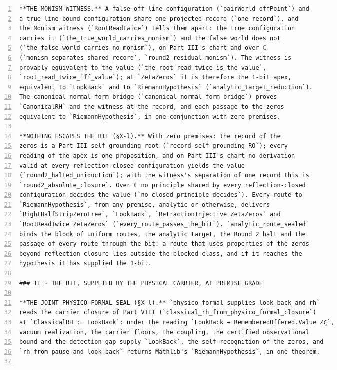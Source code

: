 \documentclass[10pt]{article}
\newcommand{\leansize}{\fontsize{5.5pt}{6.75pt}\selectfont}
\begin{document}
\begin{multicols}{2}
\begin{Verbatim}[numbers=left,firstnumber=1,numbersep=3pt,xleftmargin=2.6em,breaklines=true,breakanywhere=true,breakautoindent=false,breakindent=1.4em,breaksymbolleft={},breakanywheresymbolpre={},fontsize=\leansize]
**THE MONISM WITNESS.** A false off-line configuration (`pairWorld offPoint`) and
a true line-bound configuration share one projected record (`one_record`), and
the Monism witness (`RootReadTwice`) tells them apart: the true configuration
carries it (`the_true_world_carries_monism`) and the false world does not
(`the_false_world_carries_no_monism`), on Part III's chart and over ℂ
(`monism_separates_shared_record`, `round2_residual_monism`). The witness is
provably equivalent to the value (`the_root_read_twice_is_the_value`,
`root_read_twice_iff_value`); at `ZetaZeros` it is therefore the 1-bit apex,
equivalent to `LookBack` and to `RiemannHypothesis` (`analytic_target_reduction`).
The canonical normal-form bridge (`canonical_normal_form_bridge`) proves
`CanonicalRH` and the witness at the record, and each passage to the zeros
equivalent to `RiemannHypothesis`, in one conjunction with zero premises.

**NOTHING ESCAPES THE BIT (§X-l).** With zero premises: the record of the
zeros is a Part III self-grounding root (`record_self_grounding_RO`); every
reading of the apex is one proposition, and on Part III's chart no derivation
valid at every reflection-closed configuration yields the value
(`round2_halted_uniduction`); with the witness's separation of one record this is
`round2_absolute_closure`. Over ℂ no principle shared by every reflection-closed
configuration decides the value (`no_closed_principle_decides`). Every route to
`RiemannHypothesis`, from any premise, analytic or otherwise, delivers
`RightHalfStripZeroFree`, `LookBack`, `RetractionInjective ZetaZeros` and
`RootReadTwice ZetaZeros` (`every_route_passes_the_bit`). `analytic_route_sealed`
binds the block of uniform routes, the analytic target, the Round 2 halt and the
passage of every route through the bit: a route that uses properties of the zeros
beyond reflection closure lies outside the blocked class, and if it reaches the
hypothesis it has supplied the 1-bit.

### II · THE BIT, SUPPLIED BY THE PHYSICAL CARRIER, AT PREMISE GRADE

**THE JOINT PHYSICO-FORMAL SEAL (§X-l).** `physico_formal_supplies_look_back_and_rh`
reads the carrier closure of Part VIII (`classical_rh_from_physico_formal_closure`)
at `ClassicalRH := LookBack`: under the reading `LookBack ↔ RememberedOffered.Value Zζ`,
vacuum realization, the carrier floors, the coupling, the certified observational
bound and the detection gap supply `LookBack`, the self-recognition of the zeros, and
`rh_from_pause_and_look_back` returns Mathlib's `RiemannHypothesis`, in one theorem.


\end{Verbatim}
\end{multicols}
\end{document}
